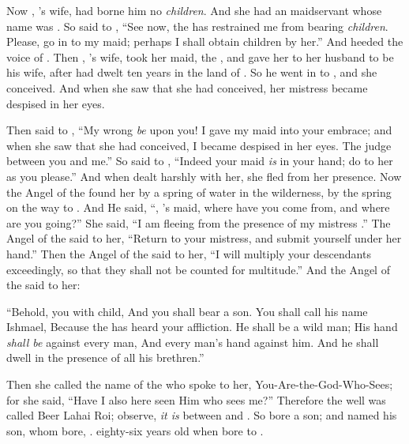 
\bverse Now , 's wife, had borne him no \textit{children}. And she had an  maidservant whose name was .
\bverse So  said to , ``See now, the \lord has restrained me from bearing \textit{children}. Please, go in to my maid; perhaps I shall obtain children by her.'' And  heeded the voice of .
\bverse Then , 's wife, took  her maid, the , and gave her to her husband  to be his wife, after  had dwelt ten years in the land of .
\bverse So he went in to , and she conceived. And when she saw that she had conceived, her mistress became despised in her eyes.

\bverse Then  said to , ``My wrong \textit{be} upon you! I gave my maid into your embrace; and when she saw that she had conceived, I became despised in her eyes. The \lord judge between you and me.''
\bverse So  said to , ``Indeed your maid \textit{is} in your hand; do to her as you please.'' And when  dealt harshly with her, she fled from her presence.
\bverse Now the Angel of the \lord found her by a spring of water in the wilderness, by the spring on the way to .
\bverse And He said, ``, 's maid, where have you come from, and where are you going?'' She said, ``I am fleeing from the presence of my mistress .''
\bverse The Angel of the \lord said to her, ``Return to your mistress, and submit yourself under her hand.''
\bverse Then the Angel of the \lord said to her, ``I will multiply your descendants exceedingly, so that they shall not be counted for multitude.''
\bverse And the Angel of the \lord said to her:
\begin{bquotation}
``Behold, you \are with child, And you shall bear a son. You shall call his name Ishmael, Because the \lord has heard your affliction. \bverse He shall be a wild man; His hand \textit{shall be} against every man, And every man's hand against him. And he shall dwell in the presence of all his brethren.''
\end{bquotation}

\bverse Then she called the name of the \lord who spoke to her, You-Are-the-God-Who-Sees; for she said, ``Have I also here seen Him who sees me?''
\bverse Therefore the well was called Beer Lahai Roi; observe, \textit{it is} between  and .
\bverse So  bore  a son; and  named his son, whom  bore, .
\bverse {} \was eighty-six years old when  bore  to .
